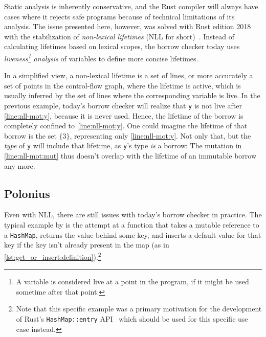 \documentclass[sigplan,11pt,screen,nonacm]{acmart}
\begin{document}
Static analysis is inherently conservative, and the Rust compiler will always have cases where it rejects safe programs because of technical limitations of its analysis. The issue presented here, however, was solved with Rust edition 2018 with the stabilization of \emph{non-lexical lifetimes} (NLL for short)~\cite{rust:nll-intro, rust:nll2}. Instead of calculating lifetimes based on lexical scopes, the borrow checker today uses \emph{liveness\footnote{A variable is considered live at a point in the program, if it might be used sometime after that point.} analysis} of variables to define more concise lifetimes.

In a simplified view, a non-lexical lifetime is a set of lines, or more accurately a set of points in the control-flow graph, where the lifetime is active, which is usually inferred by the set of lines where the corresponding variable is live. In the previous example, today's borrow checker will realize that \texttt{y} is not live after \cref*{line:nll-mot:y}, because it is never used. Hence, the lifetime of the borrow is completely confined to \cref*{line:nll-mot:y}. One could imagine the lifetime of that borrow is the set \(\{3\}\), representing only \cref*{line:nll-mot:y}. Not only that, but the \emph{type} of \texttt{y} will include that lifetime, as \texttt{y}'s type \emph{is} a borrow:
The mutation in \cref*{line:nll-mot:mut} thus doesn't overlap with the lifetime of an immutable borrow any more.


\subsection{Polonius} \label{sec:rust:polonius}

Even with NLL, there are still issues with today's borrow checker in practice. The typical example by \citet{rust:polonius-talk, rust:nll-intro, rust:nll2} is the attempt at a function that takes a mutable reference to a \texttt{HashMap}, returns the value behind some key, and inserts a default value for that key if the key isn't already present in the map (as in \cref{lst:get_or_insert:definition}).\footnote{Note that this specific example was a primary motivation for the development of Rust's \texttt{HashMap::entry} API~\cite{rust:std} which should be used for this specific use case instead.}
\end{document}

